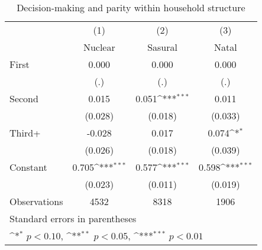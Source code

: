 \begin{table}[htbp]\centering
\def\sym#1{\ifmmode^{#1}\else\(^{#1}\)\fi}
\caption{Decision-making and parity within household structure}
\begin{tabular}{l*{3}{c}}
\hline\hline
                    &\multicolumn{1}{c}{(1)}&\multicolumn{1}{c}{(2)}&\multicolumn{1}{c}{(3)}\\
                    &\multicolumn{1}{c}{Nuclear}&\multicolumn{1}{c}{Sasural}&\multicolumn{1}{c}{Natal}\\
\hline
First               &       0.000         &       0.000         &       0.000         \\
                    &         (.)         &         (.)         &         (.)         \\
[1em]
Second              &       0.015         &       0.051\sym{***}&       0.011         \\
                    &     (0.028)         &     (0.018)         &     (0.033)         \\
[1em]
Third+              &      -0.028         &       0.017         &       0.074\sym{*}  \\
                    &     (0.026)         &     (0.018)         &     (0.039)         \\
[1em]
Constant            &       0.705\sym{***}&       0.577\sym{***}&       0.598\sym{***}\\
                    &     (0.023)         &     (0.011)         &     (0.019)         \\
\hline
Observations        &        4532         &        8318         &        1906         \\
\hline\hline
\multicolumn{4}{l}{\footnotesize Standard errors in parentheses}\\
\multicolumn{4}{l}{\footnotesize \sym{*} \(p<0.10\), \sym{**} \(p<0.05\), \sym{***} \(p<0.01\)}\\
\end{tabular}
\end{table}
